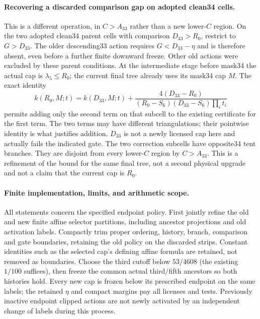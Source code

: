 \paragraph{Recovering a discarded comparison gap on adopted clean34 cells.}
This is a different operation, in $C>A_{33}$ rather than a new lower-$C$
region. On the two adopted clean34 parent cells with comparison
$D_{33}>R_0$, restrict to $G>D_{33}$. The older descending33 action
requires $G<D_{33}-\eta$ and is therefore absent, even before a further
finite downward freeze. Other old actions were excluded by these parent
conditions. At the intermediate stage before mask34 the actual cap is
$\lambda_5\le R_0$; the current final tree already uses its mask34 cap $M$.
The exact identity
\begin{equation}\label{eq:lowercomp-g-correction}
 k(R_0,M;t)=k(D_{33},M;t)+
 \frac{4(D_{33}-R_0)}{(R_0-S_6)(D_{33}-S_6)\prod_i t_i}
\end{equation}
permits adding only the second term on that subcell to the existing
certificate for the first term. The two terms may have different
triangulations; their pointwise identity is what justifies addition.
$D_{33}$ is not a newly licensed cap here and actually fails the indicated
gate. The two correction subcells have opposite34 tent branches. They
are disjoint from every lower-$C$ region by $C>A_{33}$.
This is a refinement of the bound for the same final tree, not a second
physical upgrade and not a claim that the current cap is $R_0$.

\paragraph{Finite implementation, limits, and arithmetic scope.}
All statements concern the specified endpoint policy. First jointly refine
the old and new finite affine selector partitions, including ancestor
projections and old activation labels. Compactly trim proper ordering,
history, branch, comparison and gate boundaries, retaining the old policy
on the discarded strips. Constant identities such as the selected cap's
defining affine formula are retained, not removed as boundaries. Choose
the third cutoff below $53/4608$ (the existing $1/100$ suffices), then
freeze the common actual third/fifth ancestors so both histories hold.
Every new cap is frozen below its prescribed endpoint on the same labels;
the retained $\eta$ and compact margins pay all licenses and tests.
Previously inactive endpoint clipped actions are not newly activated
by an independent change of labels during this process.

